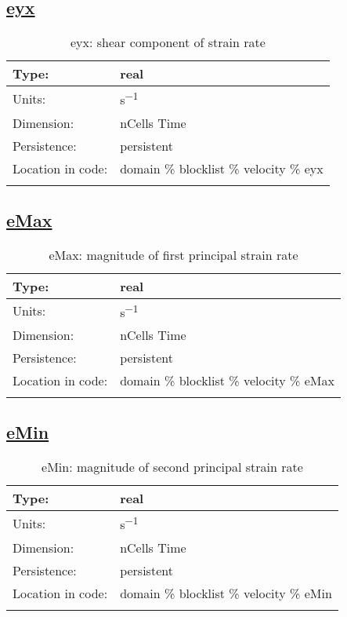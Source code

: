 \subsection[eyx]{\hyperref[sec:var_tab_velocity]{eyx}}
\label{subsec:var_sec_velocity_eyx}
\begin{center}
\begin{longtable}{| p{2.0in} | p{4.0in} |}
        \hline 
        Type: & real \\
        \hline 
        Units: & \si{s^{-1}} \\
        \hline 
        Dimension: & nCells Time \\
        \hline 
        Persistence: & persistent \\
        \hline 
         Location in code: & domain \% blocklist \% velocity \% eyx \\
         \hline 
    \caption{eyx: shear component of strain rate}
\end{longtable}
\end{center}
\subsection[eMax]{\hyperref[sec:var_tab_velocity]{eMax}}
\label{subsec:var_sec_velocity_eMax}
\begin{center}
\begin{longtable}{| p{2.0in} | p{4.0in} |}
        \hline 
        Type: & real \\
        \hline 
        Units: & \si{s^{-1}} \\
        \hline 
        Dimension: & nCells Time \\
        \hline 
        Persistence: & persistent \\
        \hline 
         Location in code: & domain \% blocklist \% velocity \% eMax \\
         \hline 
    \caption{eMax: magnitude of first principal strain rate}
\end{longtable}
\end{center}
\subsection[eMin]{\hyperref[sec:var_tab_velocity]{eMin}}
\label{subsec:var_sec_velocity_eMin}
\begin{center}
\begin{longtable}{| p{2.0in} | p{4.0in} |}
        \hline 
        Type: & real \\
        \hline 
        Units: & \si{s^{-1}} \\
        \hline 
        Dimension: & nCells Time \\
        \hline 
        Persistence: & persistent \\
        \hline 
         Location in code: & domain \% blocklist \% velocity \% eMin \\
         \hline 
    \caption{eMin: magnitude of second principal strain rate}
\end{longtable}
\end{center}
